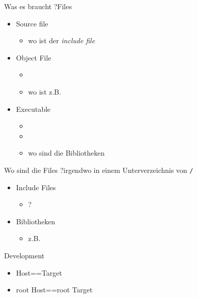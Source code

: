 \begin{frame}{Was es braucht ?}{Files}
 \begin{itemize}
  \item Source file
  \begin{itemize}
   \item wo ist der {\em include file} 
  \end{itemize}
  \item Object File
  \begin{itemize}
   \item {}
   \item wo ist z.B. 
  \end{itemize}
  \item Executable
  \begin{itemize}
  \item {}
  \item {}
  \item wo sind die Bibliotheken
  \end{itemize}
 \end{itemize}
\end{frame}

\begin{frame}{Wo sind die Files ?}{irgendwo in einem Unterverzeichnis von {\Huge\tt /}}
 \begin{itemize}
  \item Include Files 
  \begin{itemize}
   \item {} ?
  \end{itemize}
  \item Bibliotheken
  \begin{itemize}
   \item z.B. 
  \end{itemize}
 \end{itemize}
\end{frame}

\begin{frame}{Development}
 \begin{itemize}
  \item Host==Target
  \item root Host==root Target
 \end{itemize}
\end{frame}

